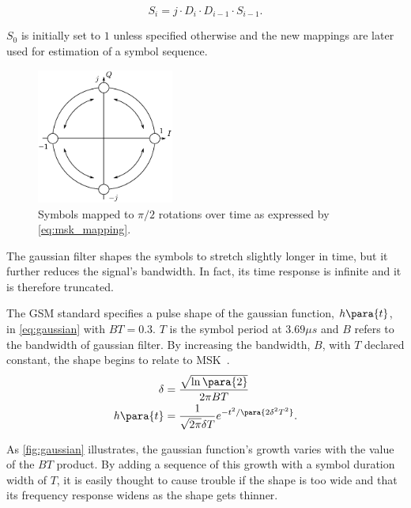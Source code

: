 \begin{equation}
  S_i = j \cdot D_i \cdot D_{i - 1} \cdot S_{i - 1}.
  \label{eq:msk_mapping}
\end{equation}

$S_0$ is initially set to $1$ unless specified otherwise and the new
mappings are later used for estimation of a symbol sequence.

\begin{figure}
  \centering
  \includegraphics[width=0.4\textwidth]{figures/constellation_diagram}
  \caption{Symbols mapped to $\pi/2$ rotations over time as expressed by
    \cref{eq:msk_mapping}.}
  \label{fig:constellation_diagram}
\end{figure}

The gaussian filter shapes the symbols to stretch slightly longer in
time, but it further reduces the signal's bandwidth. In fact, its time
response is infinite and it is therefore truncated.

The \gls{GSM} standard specifies a pulse shape of the gaussian function,
$h \para{t}$, in \cref{eq:gaussian} with $BT = 0.3$. $T$ is the symbol
period at $3.69\si{\mu s}$ and $B$ refers to the bandwidth of gaussian
filter. By increasing the bandwidth, $B$, with $T$ declared constant,
the shape begins to relate to MSK~\cite[p. 5--7]{modulation}.\
\begin{equation}
  \begin{aligned}
    \delta &= \dfrac{\sqrt{\ln \para{2}}}{2 \pi BT}\\
    h \para{t} &=
    \dfrac{1}{\sqrt{2 \pi} \delta T}
    e^{-t^2 / \para{2 \delta^2 T^2}}.
  \end{aligned}
  \label{eq:gaussian}
\end{equation}

As \cref{fig:gaussian} illustrates, the gaussian function's growth
varies with the value of the $BT$ product. By adding a sequence of
this growth with a symbol duration width of $T$, it is easily thought
to cause trouble if the shape is too wide and that its frequency
response widens as the shape gets thinner.

